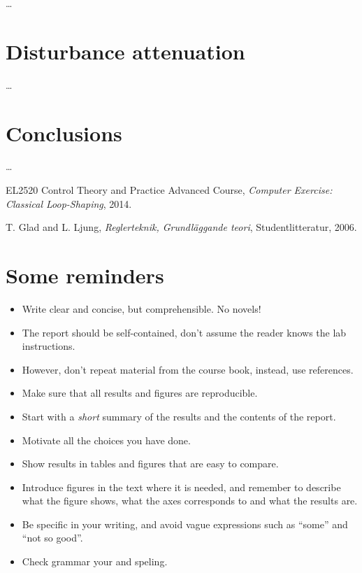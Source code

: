 \documentclass[a4paper]{article}
\begin{document}
\ldots

\section{Disturbance attenuation}
\ldots

\section{Conclusions}
\ldots

\begin{thebibliography}{9}

EL2520 Control Theory and Practice Advanced Course, \emph{Computer Exercise: Classical Loop-Shaping}, 2014.

T. Glad and L. Ljung, \emph{Reglerteknik, Grundläggande teori}, Studentlitteratur, 2006.

\end{thebibliography}



\newpage
\section{Some reminders}
\begin{itemize}
	\item Write clear and concise, but comprehensible. No novels!
	\item The report should be self-contained, don't assume the reader knows the lab instructions.
	\item However, don't repeat material from the course book, instead, use references.
	\item Make sure that all results and figures are reproducible.
	\item Start with a \emph{short} summary of the results and the contents of the report.
	\item Motivate all the choices you have done.
	\item Show results in tables and figures that are easy to compare.
	\item Introduce figures in the text where it is needed, and remember to describe what the figure shows, what the axes corresponds to and what the results are.
	\item Be specific in your writing, and avoid vague expressions such as ``some'' and ``not so good''.
	\item Check grammar your and speling.
\end{itemize}
\end{document}
